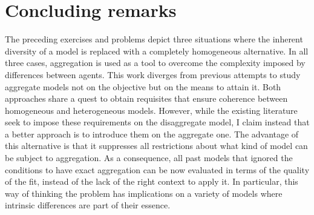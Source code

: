 \documentclass[english, a4paper, 12pt]{article}
\begin{document}
%
%


\section{Concluding remarks} \label{sec:Conclusion}

The preceding exercises and problems depict three situations where the inherent diversity of a model is replaced with a completely homogeneous alternative. In all three cases, aggregation is used as a tool to overcome the complexity imposed by differences between agents. This work diverges from previous attempts to study aggregate models not on the objective but on the means to attain it. Both approaches share a quest to obtain requisites that ensure coherence between homogeneous and heterogeneous models. However, while the existing literature seek to impose these requirements on the disaggregate model, I claim instead that a better approach is to introduce them on the aggregate one. The advantage of this alternative is that it suppresses all restrictions about what kind of model can be subject to aggregation. As a consequence, all past models that ignored the conditions to have exact aggregation can be now evaluated in terms of the quality of the fit, instead of the lack of the right context to apply it. In particular, this way of thinking the problem has implications on a variety of models where intrinsic differences are part of their essence.
\end{document}
